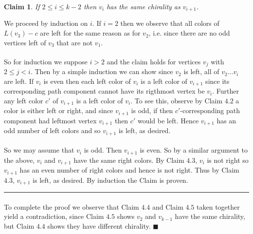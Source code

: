 \documentclass[letterpaper,12pt,oneside,onecolumn]{article}
\newenvironment{proof}{{\bf Proof:  }}{\hfill\rule{2mm}{2mm}}
\newtheorem{claim}[fact]{Claim}
\begin{document}
\begin{claim}
	If $2\leq i \leq k-2$ then $v_i$ has the same chirality as $v_{i+1}$.
\end{claim}
\begin{proof}
	We proceed by induction on $i$. If $i = 2$ then we observe that all colors of $L(v_3) - c$ are left for the same reason as for $v_2$, i.e. since there are no odd vertices left of $v_3$ that are not $v_1$.
	\paragraph{}
	So for induction we suppose $i>2$ and the claim holds for vertices $v_j$ with $2\leq j < i$. Then by a simple induction we can show since $v_2$ is left, all of $v_2\dots v_i$ are left. If $v_i$ is even then each left color of $v_i$ is a left color of $v_{i+1}$ since its corresponding path component cannot have its rigthmost vertex be $v_i$. Further any left color $c'$ of $v_{i+1}$ is a left color of $v_i$. To see this, observe by Claim $4.2$ a color is either left or right, and since $v_{i+1}$ is odd, if then $c'$-corresponding path component had leftmost vertex $v_{i+1}$ then $c'$ would be left. Hence $v_{i+1}$ has an odd number of left colors and so $v_{i+1}$ is left, as desired.
	\paragraph{}
	So we may assume that $v_i$ is odd. Then $v_{i+1}$ is even. So by a similar argument to the above, $v_i$ and $v_{i+1}$ have the same right colors. By Claim $4.3$, $v_i$ is not right so $v_{i+1}$ has an even number of right colors and hence is not right. Thus by Claim $4.3$, $v_{i+1}$ is left, as desired. By induction the Claim is proven.
\end{proof}
\paragraph{}
To complete the proof we observe that Claim $4.4$ and Claim $4.5$ taken together yield a contradiction, since Claim $4.5$ shows $v_{2}$ and $v_{k-1}$ have the same chirality, but Claim $4.4$ shows they have different chirality. $\blacksquare$
\end{document}
